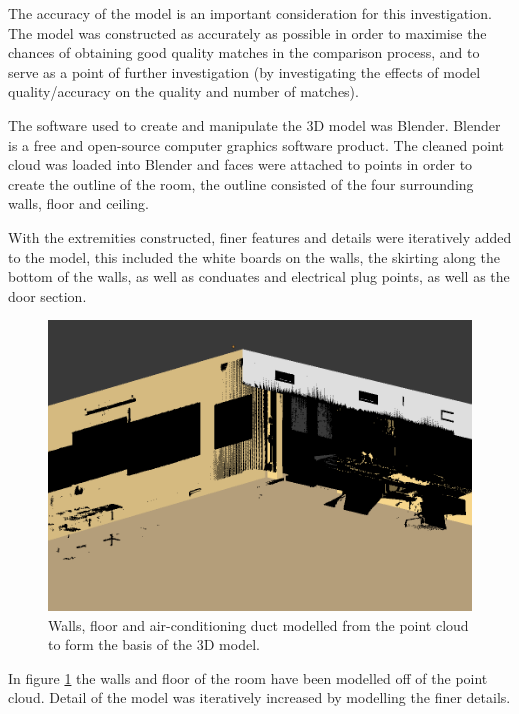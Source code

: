 \documentclass[11pt,a4paper]{report}
\begin{document}
				The accuracy of the model is an important consideration for this investigation. The model was constructed as accurately as possible in order to maximise the chances of obtaining good quality matches in the comparison process, and to serve as a point of further investigation (by investigating the effects of model quality/accuracy on the quality and number of matches).
				
				The software used to create and manipulate the 3D model was Blender. Blender is a free and open-source computer graphics software product. The cleaned point cloud was loaded into Blender and faces were attached to points in order to create the outline of the room, the outline consisted of the four surrounding walls, floor and ceiling. 
				
				With the extremities constructed, finer features and details were iteratively added to the model, this included the white boards on the walls, the skirting along the bottom of the walls, as well as conduates and electrical plug points, as well as the door section.
				
				\begin{figure}[H]
					\centering
					\includegraphics[width=1\textwidth]{simple_model_with_pc}
					\caption[Point cloud construction]{Walls, floor and air-conditioning duct modelled from the point cloud to form the basis of the 3D model.}
					\label{fig:simple_model}
				\end{figure}
				
				In figure \ref{fig:simple_model} the walls and floor of the room have been modelled off of the point cloud. Detail of the model was iteratively increased by modelling the finer details.
				
\end{document}
